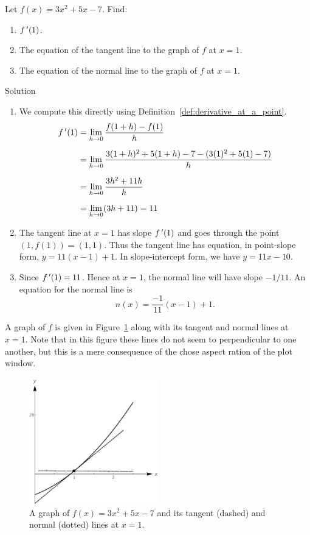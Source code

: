 \begin{example}
\label{ex_derv_point1}
Let $f(x) = 3x^2+5x-7$. Find: 

	\begin{enumerate}
	\item		$f\,'(1)$.
	\item		The equation of the tangent line to the graph of $f$ at $x=1$.
	\item   The equation of the normal line to the graph of $f$ at $x=1$.
	\end{enumerate}

Solution 


\begin{enumerate}
	\item We compute this directly using Definition~\ref{def:derivative_at_a_point}.
					\begin{align*}
					f\,'(1) &=\lim_{h\to 0} \frac{f(1+h)-f(1)}{h} \\[0.2cm]
							&=	\lim_{h\to 0} \frac{3(1+h)^2+5(1+h)-7 - (3(1)^2+5(1)-7)}{h}\\[0.2cm]
							&=\lim_{h\to 0} \frac{3h^2+11h}{h}\\[0.2cm]
							&= \lim_{h\to 0}(3h+11)= 11		
					\end{align*}

	\item		The tangent line at $x=1$ has slope $f\,'(1)$ and goes through the point $(1,f(1)) = (1,1)$. Thus the tangent line has equation, in point-slope form, $y = 11(x-1) + 1$. In slope-intercept form, we have $y = 11x-10$.
	\item  Since $f\,'(1)=11$. Hence at $x=1$, the normal line will have slope $-1/11$. An equation for the normal line is 
	$$n(x) = \frac{-1}{11}(x-1)+1.$$
		\end{enumerate}

A graph of $f$ is given in Figure~\ref{fig_diff_2} along with its tangent and normal lines at $x=1$. Note that in this figure these lines do not seem to perpendicular to one another, but this is a mere consequence of the chose aspect ration of the plot window.

\begin{figure}[H]
	\begin{center}
			\includegraphics[width=0.5\textwidth]{fig_diff_2}
	\caption{A graph of $f(x) = 3x^2+5x-7$ and its tangent (dashed) and normal (dotted) lines at $x=1$.}
	\label{fig_diff_2}
	\end{center}
\end{figure}


\end{example}


